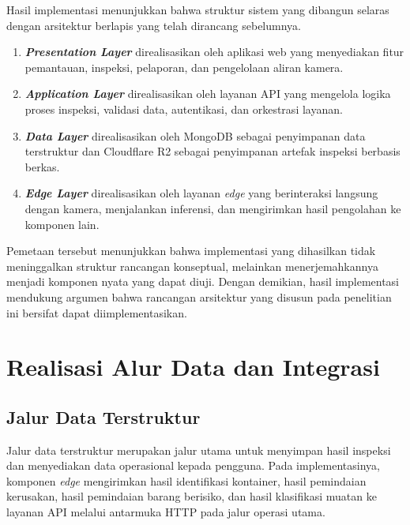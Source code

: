 Hasil implementasi menunjukkan bahwa struktur sistem yang dibangun selaras
dengan arsitektur berlapis yang telah dirancang sebelumnya.

\begin{enumerate}
    \item \textbf{\textit{Presentation Layer}} direalisasikan oleh aplikasi web
    yang menyediakan fitur pemantauan, inspeksi, pelaporan, dan pengelolaan
    aliran kamera.
    \item \textbf{\textit{Application Layer}} direalisasikan oleh layanan API
    yang mengelola logika proses inspeksi, validasi data, autentikasi, dan
    orkestrasi layanan.
    \item \textbf{\textit{Data Layer}} direalisasikan oleh MongoDB sebagai
    penyimpanan data terstruktur dan Cloudflare R2 sebagai penyimpanan artefak
    inspeksi berbasis berkas.
    \item \textbf{\textit{Edge Layer}} direalisasikan oleh layanan \textit{edge}
    yang berinteraksi langsung dengan kamera, menjalankan inferensi, dan
    mengirimkan hasil pengolahan ke komponen lain.
\end{enumerate}

Pemetaan tersebut menunjukkan bahwa implementasi yang dihasilkan tidak
meninggalkan struktur rancangan konseptual, melainkan menerjemahkannya menjadi
komponen nyata yang dapat diuji. Dengan demikian, hasil implementasi mendukung
argumen bahwa rancangan arsitektur yang disusun pada penelitian ini bersifat
dapat diimplementasikan.

\section{Realisasi Alur Data dan Integrasi}
\label{sec:realisasi-alur-data}

\subsection{Jalur Data Terstruktur}
\label{subsec:jalur-data-terstruktur}

Jalur data terstruktur merupakan jalur utama untuk menyimpan hasil inspeksi dan
menyediakan data operasional kepada pengguna. Pada implementasinya, komponen
\textit{edge} mengirimkan hasil identifikasi kontainer, hasil pemindaian
kerusakan, hasil pemindaian barang berisiko, dan hasil klasifikasi muatan ke
layanan API melalui antarmuka HTTP pada jalur operasi utama.


